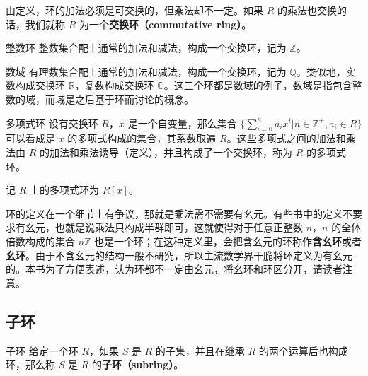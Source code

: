 由定义，环的加法必须是可交换的，但乘法却不一定。如果 $R$ 的乘法也交换的话，我们就称 $R$ 为一个\textbf{交换环（commutative ring）}。

\begin{example}{整数环}
整数集合配上通常的加法和减法，构成一个交换环，记为 $\mathbb{Z}$。
\end{example}

\begin{example}{数域}
有理数集合配上通常的加法和减法，构成一个交换环，记为 $\mathbb{Q}$。类似地，实数构成交换环 $\mathbb{R}$，复数构成交换环 $\mathbb{C}$。这三个环都是数域的例子，数域是指包含整数的域，而域是之后基于环而讨论的概念。
\end{example}

\begin{example}{多项式环}\label{Ring_ex1}
设有交换环 $R$，$x$ 是一个自变量，那么集合 $\{\sum\limits_{i=0}^n a_ix^i|n\in\mathbb{Z}^+, a_i\in R\}$ 可以看成是 $x$ 的多项式构成的集合，其系数取遍 $R$。这些多项式之间的加法和乘法由 $R$ 的加法和乘法诱导（定义），并且构成了一个交换环，称为 $R$ 的多项式环。

记 $R$ 上的多项式环为 $R[x]$。
\end{example}

环的定义在一个细节上有争议，那就是乘法需不需要有幺元。有些书中的定义不要求有幺元，也就是说乘法只构成半群即可，这就使得对于任意正整数 $n$，$n$ 的全体倍数构成的集合 $n\mathbb{Z}$ 也是一个环；在这种定义里，会把含幺元的环称作\textbf{含幺环}或者\textbf{幺环}。由于不含幺元的结构一般不研究，所以主流数学界干脆将环定义为有幺元的。本书为了方便表述，认为环都不一定由幺元，将幺环和环区分开，请读者注意。

\subsection{子环}

\begin{definition}{子环}
给定一个环 $R$，如果 $S$ 是 $R$ 的子集，并且在继承 $R$ 的两个运算后也构成环，那么称 $S$ 是 $R$ 的\textbf{子环（subring）}。
\end{definition}



